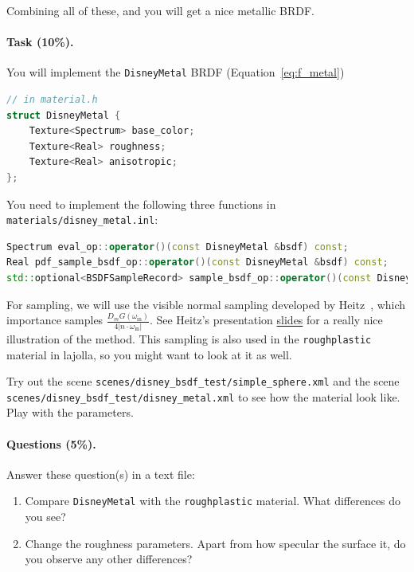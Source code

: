 Combining all of these, and you will get a nice metallic BRDF.

\paragraph{Task (10\%).} You will implement the \lstinline{DisneyMetal} BRDF (Equation~\ref{eq:f_metal})
\begin{lstlisting}[language=c++]
// in material.h
struct DisneyMetal {
    Texture<Spectrum> base_color;
    Texture<Real> roughness;
    Texture<Real> anisotropic;
};
\end{lstlisting}

You need to implement the following three functions in \lstinline{materials/disney_metal.inl}:
\begin{lstlisting}[language=c++]
Spectrum eval_op::operator()(const DisneyMetal &bsdf) const;
Real pdf_sample_bsdf_op::operator()(const DisneyMetal &bsdf) const;
std::optional<BSDFSampleRecord> sample_bsdf_op::operator()(const DisneyMetal &bsdf) const;
\end{lstlisting}

For sampling, we will use the visible normal sampling developed by Heitz~\cite{Heitz:2018:SGD}, which importance samples $\frac{D_m G(\omega_{\text{in}})}{4 |n \cdot \omega_{\text{in}}|}$. See Heitz's presentation \href{https://jcgt.org/published/0007/04/01/slides.pdf}{slides} for a really nice illustration of the method. This sampling is also used in the \lstinline{roughplastic} material in lajolla, so you might want to look at it as well.

Try out the scene \lstinline{scenes/disney_bsdf_test/simple_sphere.xml} and the scene \lstinline{scenes/disney_bsdf_test/disney_metal.xml} to see how the material look like. Play with the parameters.

\paragraph{Questions (5\%).} Answer these question(s) in a text file:
\begin{enumerate}
	\item Compare \lstinline{DisneyMetal} with the \lstinline{roughplastic} material. What differences do you see?
	\item Change the roughness parameters. Apart from how specular the surface it, do you observe any other differences?
\end{enumerate}

